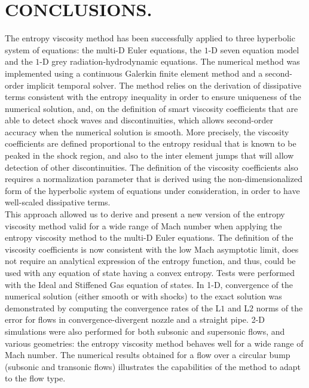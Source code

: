 %
%
%


\chapter{\uppercase {Conclusions.}}\label{chap:conclusion}
The entropy viscosity method has been successfully applied to three hyperbolic system of equations: the multi-D Euler equations, the $1$-D seven equation model and the $1$-D grey radiation-hydrodynamic equations. The numerical method was implemented using a continuous Galerkin finite element method and a second-order implicit temporal solver. The method relies on the derivation of dissipative terms consistent with the entropy inequality in order to ensure uniqueness of the numerical solution, and, on the definition of smart viscosity coefficients that are able to detect shock waves and discontinuities, which allows second-order accuracy when the numerical solution is smooth. More precisely, the viscosity coefficients are defined proportional to the entropy residual that is known to be peaked in the shock region, and also to the inter element jumps that will allow detection of other discontinuities. The definition of the viscosity coefficients also requires a normalization parameter that is derived using the non-dimensionalized form of the hyperbolic system of equations under consideration, in order to have well-scaled dissipative terms. \\

This approach allowed us to derive and present a new version of the entropy viscosity method valid for a wide range of Mach number when applying the entropy viscosity method to the multi-D Euler equations. The definition of the viscosity coefficients is now consistent with the low Mach asymptotic limit, does not require an analytical expression of the entropy function, and thus, could be used with any equation of state having a convex entropy. Tests were performed with the Ideal and Stiffened Gas equation of states. In 1-D, convergence of the numerical solution (either smooth or with shocks) to the exact solution was demonstrated by computing the convergence rates of the L$1$ and L$2$ norms of the error for flows in convergence-divergent nozzle and a straight pipe. 2-D simulations were also performed for both subsonic and supersonic flows, and various geometries: the entropy viscosity method behaves well for a wide range of Mach number. The numerical results obtained for a flow over a circular bump (subsonic and transonic flows) illustrates the capabilities of the method to adapt to the flow type.

